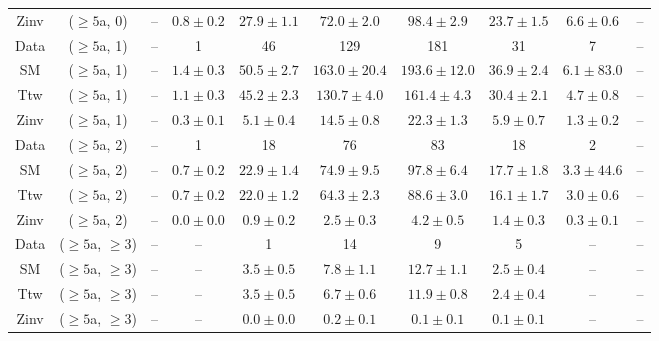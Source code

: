 \begin{table}[h!]
{\begin{tabular}{cccccccccc}
	Zinv & ($\ge5$a, 0) & -- & $0.8\pm 0.2$ & $27.9\pm 1.1$ & $72.0\pm 2.0$ & $98.4\pm 2.9$ & $23.7\pm 1.5$ & $6.6\pm 0.6$ & -- \\[0.5ex] 
	Data & ($\ge5$a, 1) & -- & 1 & 46 & 129 & 181 & 31 & 7 & -- \\[0.5ex] 
	SM & ($\ge5$a, 1) & -- & $1.4\pm 0.3$ & $50.5\pm 2.7$ & $163.0\pm 20.4$ & $193.6\pm 12.0$ & $36.9\pm 2.4$ & $6.1\pm 83.0$ & -- \\[0.5ex] 
	Ttw & ($\ge5$a, 1) & -- & $1.1\pm 0.3$ & $45.2\pm 2.3$ & $130.7\pm 4.0$ & $161.4\pm 4.3$ & $30.4\pm 2.1$ & $4.7\pm 0.8$ & -- \\[0.5ex] 
	Zinv & ($\ge5$a, 1) & -- & $0.3\pm 0.1$ & $5.1\pm 0.4$ & $14.5\pm 0.8$ & $22.3\pm 1.3$ & $5.9\pm 0.7$ & $1.3\pm 0.2$ & -- \\[0.5ex] 
	Data & ($\ge5$a, 2) & -- & 1 & 18 & 76 & 83 & 18 & 2 & -- \\[0.5ex] 
	SM & ($\ge5$a, 2) & -- & $0.7\pm 0.2$ & $22.9\pm 1.4$ & $74.9\pm 9.5$ & $97.8\pm 6.4$ & $17.7\pm 1.8$ & $3.3\pm 44.6$ & -- \\[0.5ex] 
	Ttw & ($\ge5$a, 2) & -- & $0.7\pm 0.2$ & $22.0\pm 1.2$ & $64.3\pm 2.3$ & $88.6\pm 3.0$ & $16.1\pm 1.7$ & $3.0\pm 0.6$ & -- \\[0.5ex] 
	Zinv & ($\ge5$a, 2) & -- & $0.0\pm 0.0$ & $0.9\pm 0.2$ & $2.5\pm 0.3$ & $4.2\pm 0.5$ & $1.4\pm 0.3$ & $0.3\pm 0.1$ & -- \\[0.5ex] 
	Data & ($\ge5$a, $\ge3$) & -- & -- & 1 & 14 & 9 & 5 & -- & -- \\[0.5ex] 
	SM & ($\ge5$a, $\ge3$) & -- & -- & $3.5\pm 0.5$ & $7.8\pm 1.1$ & $12.7\pm 1.1$ & $2.5\pm 0.4$ & -- & -- \\[0.5ex] 
	Ttw & ($\ge5$a, $\ge3$) & -- & -- & $3.5\pm 0.5$ & $6.7\pm 0.6$ & $11.9\pm 0.8$ & $2.4\pm 0.4$ & -- & -- \\[0.5ex] 
	Zinv & ($\ge5$a, $\ge3$) & -- & -- & $0.0\pm 0.0$ & $0.2\pm 0.1$ & $0.1\pm 0.1$ & $0.1\pm 0.1$ & -- & -- \\[0.5ex] 
	\hline
	\hline
\end{tabular}}
\end{table}
